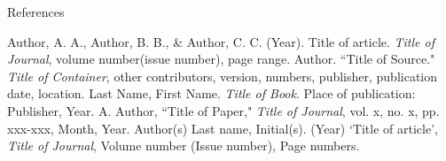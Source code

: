 \documentclass[aspectratio=169,xcolor=dvipsnames, t]{beamer}
\begin{document}
\begin{frame}{References}
    \footnotesize{
        \begin{thebibliography}{}
            Author, A. A., Author, B. B., \& Author, C. C. (Year). Title of article. \textit{Title of Journal}, volume number(issue number), page range.
            Author. ``Title of Source." \textit{Title of Container}, other contributors, version, numbers, publisher, publication date, location.
            Last Name, First Name. \textit{Title of Book}. Place of publication: Publisher, Year.
            A. Author, ``Title of Paper," \textit{Title of Journal}, vol. x, no. x, pp. xxx-xxx, Month, Year.
            Author(s) Last name, Initial(s). (Year) `Title of article', \textit{Title of Journal}, Volume number (Issue number), Page numbers.
        \end{thebibliography}
    }
\end{frame}

\makefinalpage
\end{document}
